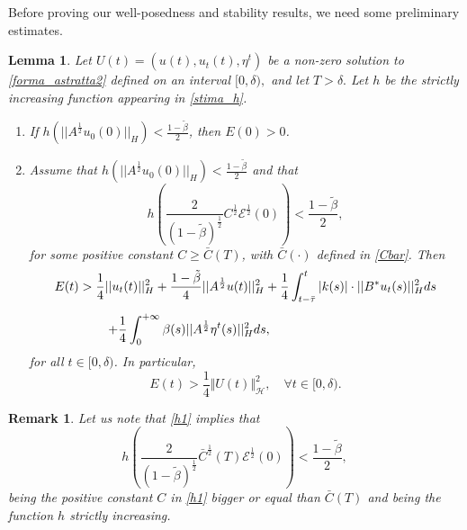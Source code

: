 \documentclass[11pt]{article}
\newtheorem{Lemma}[Theorem]{Lemma}
\newtheorem{Remark}[Theorem]{Remark}
\renewcommand{\geq}{\geqslant}
\begin{document}
Before proving our well-posedness and stability results, we need some preliminary estimates. 

\begin{Lemma}
	\label{Lemma 2}
	Let $U(t)=(u(t),u_t(t),\eta^t)$ be a non-zero solution to \eqref{forma_astratta2} defined on an interval $[0, \delta),$ and let $T>\delta.$ Let $h$ be the strictly increasing function appearing in \eqref{stima_h}. 
	\begin{enumerate}
		\item If $h(||A^\frac{1}{2} u_0(0)||_H)<\frac{1-\tilde{\beta}}{2}$, then $E(0)>0$.
		\item Assume that $h(||A^\frac{1}{2} u_0(0)||_H)<\frac{1-\tilde{\beta}}{2}$ and that
		\begin{equation}\label{h1}
			h \left( \frac{2}{(1-\tilde{\beta})^\frac{1}{2}} C^{\frac{1}{2}}\mathcal{E}^\frac{1}{2}(0) \right) <\frac{1-\tilde{\beta}}{2},
		\end{equation}
		for some positive constant $C\geq \bar{C}(T)$, with $\bar{C}(\cdot)$ defined in  \eqref{Cbar}. Then
		\begin{equation}
			\label{stima E dal basso}
			\begin{array}{l}
				\vspace{0.3cm}\displaystyle{ E(t)>\frac{1}{4}||u_t(t)||_H^2+\frac{1-\tilde{\beta}}{4}||A^\frac{1}{2}u(t)||_H^2+\frac{1}{4}\int_{t-\bar\tau}^t |k(s)| \cdot ||B^*u_t(s)||_H^2 ds}\\
				\hspace{1.5 cm}
				\displaystyle{ +\frac{1}{4}\int_0^{+\infty} \beta(s) ||A^\frac{1}{2}\eta^t (s)||_H^2 ds,}
			\end{array}
		\end{equation}
		for all $t\in[0, \delta)$. In particular,
		\begin{equation}\label{J2}
			E(t)>  \frac 14 \Vert U(t)\Vert_{\mathcal H}^2, \quad \forall t\in [0, \delta).
		\end{equation}
	\end{enumerate}
\end{Lemma}
\begin{Remark}
	Let us note that \eqref{h1} implies that 
	\begin{equation}\label{h2}
		h \left( \frac{2}{(1-\tilde{\beta})^\frac{1}{2}} \bar{C}^{\frac{1}{2}}(T)\mathcal{E}^\frac{1}{2}(0) \right) <\frac{1-\tilde{\beta}}{2},
	\end{equation}
being the positive constant $C$ in \eqref{h1} bigger or equal than $\bar{C}(T)$ and being the function $h$ strictly increasing.
\end{Remark}
\end{document}
